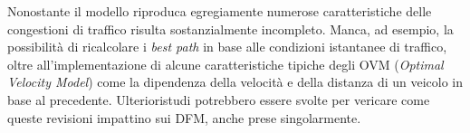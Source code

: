 \documentclass[../main.tex]{subfiles}
\begin{document}
Nonostante il modello riproduca egregiamente numerose caratteristiche delle congestioni di traffico risulta sostanzialmente incompleto.
Manca, ad esempio, la possibilit\`a di ricalcolare i \emph{best path} in base alle condizioni istantanee di traffico, oltre all'implementazione di alcune caratteristiche tipiche degli OVM (\emph{Optimal Velocity Model}) come la dipendenza della velocit\`a e della distanza di un veicolo in base al precedente.
Ulterioristudi potrebbero essere svolte per vericare come queste revisioni impattino sui DFM, anche prese singolarmente.




\end{document}
